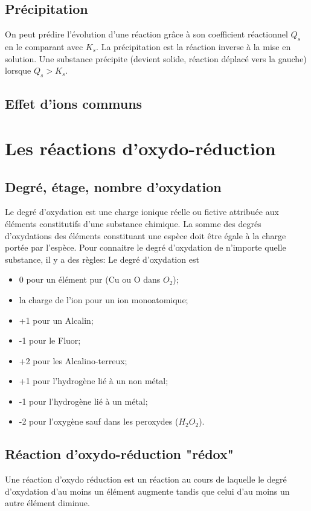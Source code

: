 \subsection{Précipitation}
On peut prédire l'évolution d'une réaction grâce à son coefficient réactionnel
$Q_s$ en le comparant avec $K_s$.
La précipitation est la réaction inverse à la mise en solution.
Une substance précipite (devient solide, réaction déplacé vers la gauche)
lorsque $Q_s > K_s$.

\subsection{Effet d'ions communs}

\section{Les réactions d'oxydo-réduction}
\subsection{Degré, étage, nombre d'oxydation}
Le degré d'oxydation est une charge ionique réelle ou fictive attribuée
aux éléments constitutifs d'une substance chimique.
La somme des degrés d'oxydations des éléments constituant une espèce
doit être égale à la charge portée par l'espèce.
Pour connaitre le degré d'oxydation de n'importe quelle substance,
il y a des règles:
Le degré d'oxydation est
\begin{itemize}
  \item 0 pour un élément pur (Cu ou O dans $O_2$);
  \item la charge de l'ion pour un ion monoatomique;
  \item +1 pour un Alcalin;
  \item -1 pour le Fluor;
  \item +2 pour les Alcalino-terreux;
  \item +1 pour l'hydrogène lié à un non métal;
  \item -1 pour l'hydrogène lié à un métal;
  \item -2 pour l'oxygène sauf dans les peroxydes ($H_2O_2$).
\end{itemize}

\subsection{Réaction d'oxydo-réduction "rédox"}
Une réaction d'oxydo réduction est un réaction au cours de laquelle
le degré d'oxydation d'au moins un élément augmente tandis que celui
d'au moins un autre élément diminue.

